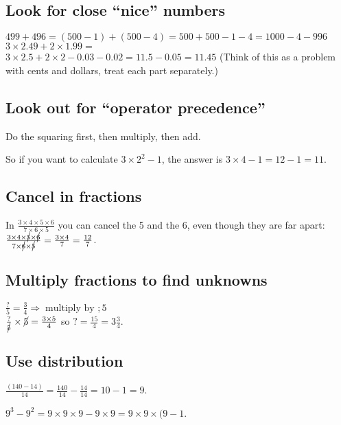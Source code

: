 \documentclass[fullpage,twocolumn]{article}
\begin{document}
\subsection{Look for close ``nice'' numbers}
$499 + 496 = (500 - 1) + (500 - 4 ) = 500 + 500 - 1 - 4 = 1000 - 4 - 996$\\

$3 \times 2.49 + 2 \times 1.99 =$ \\
$ 3 \times 2.5 + 2 \times 2 - 0.03 - 0.02 = 11.5 - 0.05 = 11.45$
(Think of this as a problem with cents and dollars, treat each part separately.)

\subsection{Look out for ``operator precedence''}

Do the squaring first, then multiply, then add.  

So if you want to calculate $3 \times 2^2 - 1$, 
the answer is $3\times  4 -  1 = 12 - 1 = 11$.

\subsection{Cancel in fractions}

In $\frac{3 \times 4 \times 5 \times 6}{7 \times 6 \times 5}$ you can cancel
the 5 and the 6, even though they are far apart: $\frac{3 \times 4 \times \cancel{5}
\times \cancel{6}}{ 7 \times  \cancel{6} \times \cancel{5}} = \frac{3 \times 4}{7} = \frac{12}{7}$.

\subsection{Multiply fractions to find unknowns}

$\frac{?}{5} = \frac{3}{4} \Rightarrow \; \mbox{multiply by } ; 5$\\
$\frac{?}{\cancel{5}} \times \cancel{5} = \frac{3 \times 5}{4}$ so  $? = \frac{15}{4} = 3\frac{3}{4}$.

\subsection{Use distribution}

$\frac{(140 - 14)}{14} = \frac{140}{14} - \frac{14}{14} = 10 - 1 = 9$.

$9^3 - 9^2 = 9 \times 9 \times 9 - 9 \times 9 = 9 \times 9 \times (9 - 1$.
\end{document}
